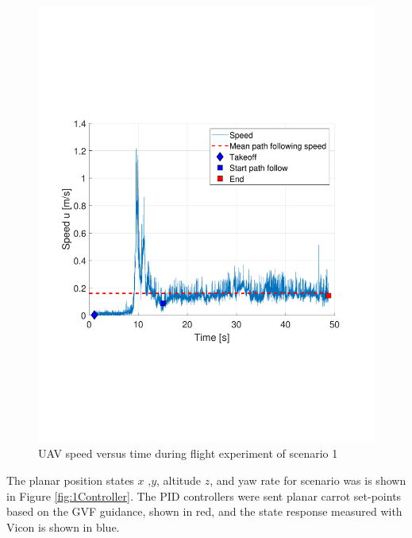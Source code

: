 \documentclass[numbered,pdftex]{ohio-etd}
\begin{document}
\begin{figure}[H]
	\centering
	\includegraphics[trim = 0 150 0 200, clip, width=12cm]{Figures/results/compareFigures/1u}
	\caption{UAV speed versus time during flight experiment of scenario 1}
	\label{fig:1u}
\end{figure}


The planar position states $x$ ,$y$, altitude $z$, and yaw rate for scenario was is shown in Figure \ref{fig:1Controller}. The PID controllers were sent planar carrot set-points based on the GVF guidance, shown in red, and the state response measured with Vicon is shown in blue. 
\end{document}
